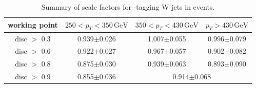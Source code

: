\begin{table}
\centering
\caption{Summary of scale factors for \bbbar-tagging W jets in \ttbar events.}
\label{tab:sf}
\begin{tabular}{c|ccc}
\hline\hline
working point & $250 < p_{T} < 350\,\textrm{GeV}$ & $350 < p_{T} < 430\,\textrm{GeV}$ & $p_{T}>430\,\textrm{GeV}$\\
\hline
disc $>$ 0.3 & 0.939$\pm$0.026 & 1.007$\pm$0.055 & 0.996$\pm$0.079 \\
disc $>$ 0.6 & 0.922$\pm$0.027 & 0.967$\pm$0.057 & 0.902$\pm$0.082  \\
disc $>$ 0.8 & 0.875$\pm$0.030 & 0.939$\pm$0.063 & 0.893$\pm$0.090  \\
disc $>$ 0.9 & 0.855$\pm$0.036 & \multicolumn{2}{c}{0.914$\pm$0.068} \\
\hline\hline
\end{tabular}
\end{table}


